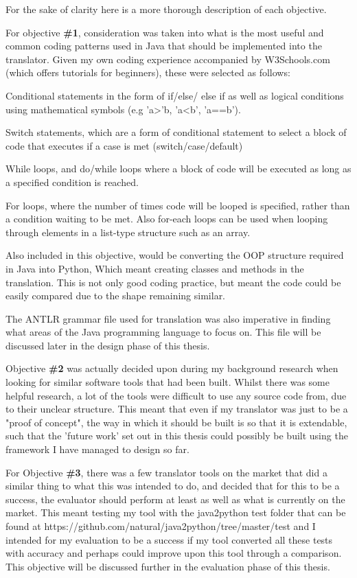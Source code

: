 \documentclass{l4proj}
\begin{document}
For the sake of clarity here is a more thorough description of each objective.

For objective \textbf{\#1}, consideration was taken into what is the most useful and common coding patterns used in Java that should be implemented into the translator. Given my own coding experience accompanied by W3Schools.com (which offers tutorials for beginners), these were selected as follows:

Conditional statements in the form of if/else/ else if as well as logical conditions using mathematical symbols (e.g 'a>'b, 'a<b', 'a==b').

Switch statements, which are a form of conditional statement to select a block of code that executes if a case is met (switch/case/default)

While loops, and do/while loops where a block of code will be executed as long as a specified condition is reached.

For loops, where the number of times code will be looped is specified, rather than a condition waiting to be met. Also for-each loops can be used when looping through elements in a list-type structure such as an array.

Also included in this objective, would be converting the OOP structure required in Java into Python, Which meant creating classes and methods in the translation. This is not only good coding practice, but meant the code could be easily compared due to the shape remaining similar.

The ANTLR grammar file used for translation was also imperative in finding what areas of the Java programming language to focus on. This file will be discussed later in the design phase of this thesis.

Objective \textbf{\#2} was actually decided upon during my background research when looking for similar software tools that had been built. Whilst there was some helpful research, a lot of the tools were difficult to use any source code from, due to their unclear structure. 
This meant that even if my translator was just to be a "proof of concept", the way in which it should be built is so that it is extendable, such that the 'future work' set out in this thesis could possibly be built using the framework I have managed to design so far.

For Objective \textbf{\#3}, there was a few translator tools on the market that did a similar thing to what this was intended to do, and decided that for this to be a success, the evaluator should perform at least as well as what is currently on the market. This meant testing my tool with the java2python test folder that can be found at https://github.com/natural/java2python/tree/master/test and I intended for my evaluation to be a success if my tool converted all these tests with accuracy and perhaps could improve upon this tool through a comparison. This objective will be discussed further in the evaluation phase of this thesis.
\end{document}

